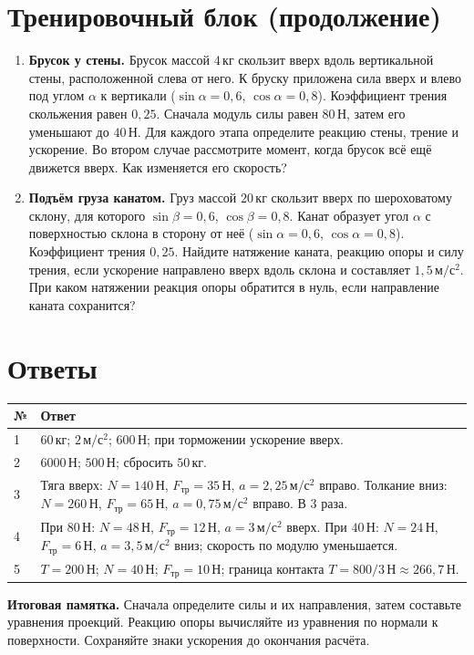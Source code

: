 \documentclass[a4paper,12pt]{article}
\newcommand{\fr}{F_{\text{тр}}}
\newcommand{\unit}[1]{\,\text{#1}}
\newcommand{\acc}{\unit{м/с$^2$}}
\newcommand{\N}{\unit{Н}}
\newcommand{\kg}{\unit{кг}}
\begin{document}
\section*{Тренировочный блок (продолжение)}
\begin{enumerate}[resume]
\item \textbf{Брусок у стены.} Брусок массой $4\kg$ скользит вверх вдоль вертикальной стены, расположенной слева от него. К бруску приложена сила вверх и влево под углом $\alpha$ к вертикали ($\sin\alpha=0,6$, $\cos\alpha=0,8$). Коэффициент трения скольжения равен $0,25$. Сначала модуль силы равен $80\N$, затем его уменьшают до $40\N$. Для каждого этапа определите реакцию стены, трение и ускорение. Во втором случае рассмотрите момент, когда брусок всё ещё движется вверх. Как изменяется его скорость?
\item \textbf{Подъём груза канатом.} Груз массой $20\kg$ скользит вверх по шероховатому склону, для которого $\sin\beta=0,6$, $\cos\beta=0,8$. Канат образует угол $\alpha$ с поверхностью склона в сторону от неё ($\sin\alpha=0,6$, $\cos\alpha=0,8$). Коэффициент трения $0,25$. Найдите натяжение каната, реакцию опоры и силу трения, если ускорение направлено вверх вдоль склона и составляет $1,5\acc$. При каком натяжении реакция опоры обратится в нуль, если направление каната сохранится?
\end{enumerate}
\clearpage
\section*{Ответы}
\renewcommand{\arraystretch}{1.35}
\begin{tabularx}{\linewidth}{@{}p{.8cm}X@{}}
\toprule № & Ответ \\ \midrule
1 & $60\kg$; $2\acc$; $600\N$; при торможении ускорение вверх.\\
2 & $6000\N$; $500\N$; сбросить $50\kg$.\\
3 & Тяга вверх: $N=140\N$, $\fr=35\N$, $a=2,25\acc$ вправо. Толкание вниз: $N=260\N$, $\fr=65\N$, $a=0,75\acc$ вправо. В $3$ раза.\\
4 & При $80\N$: $N=48\N$, $\fr=12\N$, $a=3\acc$ вверх. При $40\N$: $N=24\N$, $\fr=6\N$, $a=3,5\acc$ вниз; скорость по модулю уменьшается.\\
5 & $T=200\N$; $N=40\N$; $\fr=10\N$; граница контакта $T=800/3\N\approx266,7\N$.\\
\bottomrule
\end{tabularx}
\vspace{7mm}
\textcolor{darkaccent}{\textbf{Итоговая памятка.}} Сначала определите силы и их направления, затем составьте уравнения проекций. Реакцию опоры вычисляйте из уравнения по нормали к поверхности. Сохраняйте знаки ускорения до окончания расчёта.
\end{document}

